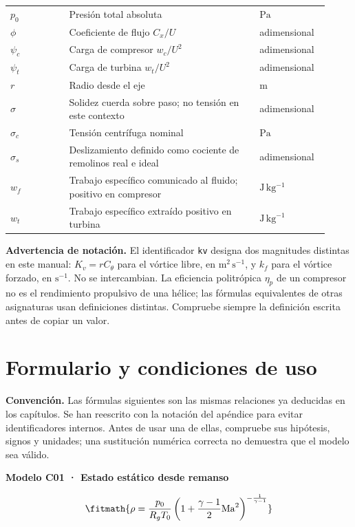 \documentclass[10pt,openany]{book}
\begin{document}
\begin{longtable}{@{}>{\centering\arraybackslash}p{0.17\linewidth}>{\raggedright\arraybackslash}p{0.55\linewidth}>{\raggedright\arraybackslash}p{0.2\linewidth}@{}}
$p_{0}$ & Presión total absoluta & $\mathrm{Pa}$ \\
$\phi$ & Coeficiente de flujo $C_x/U$ & adimensional \\
$\psi_c$ & Carga de compresor $w_c/U^2$ & adimensional \\
$\psi_t$ & Carga de turbina $w_t/U^2$ & adimensional \\
$r$ & Radio desde el eje & $\mathrm{m}$ \\
$\sigma$ & Solidez cuerda sobre paso; no tensión en este contexto & adimensional \\
$\sigma_{c}$ & Tensión centrífuga nominal & $\mathrm{Pa}$ \\
$\sigma_{s}$ & Deslizamiento definido como cociente de remolinos real e ideal & adimensional \\
$w_{f}$ & Trabajo específico comunicado al fluido; positivo en compresor & $\mathrm{J\,kg^{-1}}$ \\
$w_{t}$ & Trabajo específico extraído positivo en turbina & $\mathrm{J\,kg^{-1}}$ \\
\end{longtable}
\endgroup
\par\medskip\noindent\textbf{Advertencia de notación.} El identificador \texttt{kv} designa dos magnitudes distintas en este manual: $K_v=rC_\theta$ para el vórtice libre, en $\mathrm{m^2\,s^{-1}}$, y $k_f$ para el vórtice forzado, en $\mathrm{s^{-1}}$. No se intercambian. La eficiencia politrópica $\eta_p$ de un compresor no es el rendimiento propulsivo de una hélice; las fórmulas equivalentes de otras asignaturas usan definiciones distintas. Compruebe siempre la definición escrita antes de copiar un valor.\par\medskip
\chapter{Formulario y condiciones de uso}

\textbf{Convención.} Las fórmulas siguientes son las mismas relaciones ya deducidas en los capítulos. Se han reescrito con la notación del apéndice para evitar identificadores internos. Antes de usar una de ellas, compruebe sus hipótesis, signos y unidades; una sustitución numérica correcta no demuestra que el modelo sea válido.

\noindent\textbf{Modelo C01 · Estado estático desde remanso}

\[
\fitmath{\rho=\frac{p_0}{R_g T_0}\left(1+\frac{\gamma-1}{2}\mathrm{Ma}^2\right)^{-\frac{1}{\gamma-1}}}
\]
\end{document}
